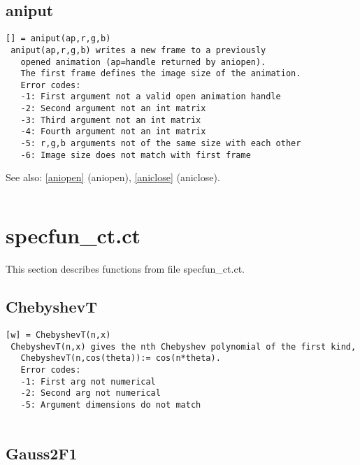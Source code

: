 \documentclass[a4paper]{article}
\begin{document}
\subsection{aniput\label{aniput}}

\begin{tscreen}
\begin{verbatim}
[] = aniput(ap,r,g,b)
 aniput(ap,r,g,b) writes a new frame to a previously
   opened animation (ap=handle returned by aniopen).
   The first frame defines the image size of the animation.
   Error codes:
   -1: First argument not a valid open animation handle
   -2: Second argument not an int matrix
   -3: Third argument not an int matrix
   -4: Fourth argument not an int matrix
   -5: r,g,b arguments not of the same size with each other
   -6: Image size does not match with first frame
\end{verbatim}

See also: \ref{aniopen} {(aniopen)}, \ref{aniclose} {(aniclose)}.
\begin{verbatim}
\end{verbatim}
\end{tscreen}





\section{specfun\_ct.ct}

This section describes functions from file specfun\_ct.ct.




\subsection{ChebyshevT\label{ChebyshevT}}

\begin{tscreen}
\begin{verbatim}
[w] = ChebyshevT(n,x)
 ChebyshevT(n,x) gives the nth Chebyshev polynomial of the first kind,
   ChebyshevT(n,cos(theta)):= cos(n*theta).
   Error codes:
   -1: First arg not numerical
   -2: Second arg not numerical
   -5: Argument dimensions do not match
 
\end{verbatim}
\end{tscreen}



\subsection{Gauss2F1\label{Gauss2F1}}
\end{document}
